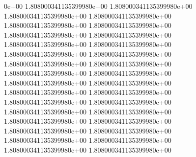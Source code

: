0e+00	1.808000341135399980e+00	1.808000341135399980e+00	1.808000341135399980e+00	1.808000341135399980e+00	1.808000341135399980e+00	1.808000341135399980e+00	1.808000341135399980e+00	1.808000341135399980e+00	1.808000341135399980e+00	1.808000341135399980e+00	1.808000341135399980e+00	1.808000341135399980e+00	1.808000341135399980e+00	1.808000341135399980e+00	1.808000341135399980e+00	1.808000341135399980e+00	1.808000341135399980e+00	1.808000341135399980e+00	1.808000341135399980e+00	1.808000341135399980e+00	1.808000341135399980e+00	1.808000341135399980e+00	1.808000341135399980e+00	1.808000341135399980e+00	1.808000341135399980e+00	1.808000341135399980e+00	1.808000341135399980e+00	1.808000341135399980e+00	1.808000341135399980e+00	1.808000341135399980e+00	1.808000341135399980e+00	1.808000341135399980e+00

